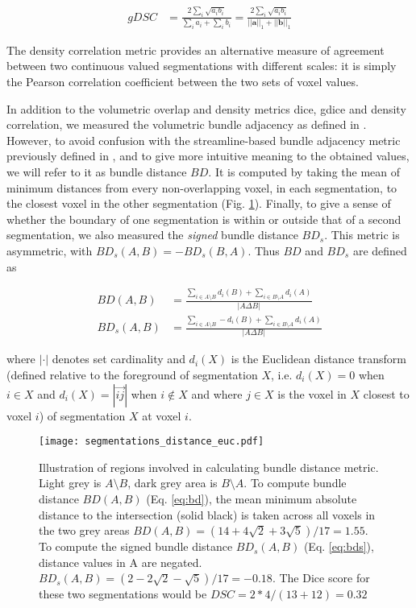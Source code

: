 \begin{align}
  gDSC &= \frac{2 \sum_i \sqrt{a_ib_i} }{\sum_ia_i + \sum_ib_i}
   =  \frac{2 \sum_i \sqrt{a_ib_i} }{||\mathbf{a}||_1 + ||\mathbf{b}||_1}
\end{align}

The density correlation metric provides an alternative measure of agreement between two continuous valued segmentations with different scales:
it is simply the Pearson correlation coefficient between the two sets of voxel values.

In addition to the volumetric overlap and density metrics \gls{dice}, \gls{gdice} and density correlation, we measured the volumetric bundle adjacency as defined in \textcite{Schilling2021a}.
However, to avoid confusion with the streamline-based bundle adjacency\autocite{Radwan2022, Garyfallidis2012, Rheault2022} metric previously defined in \textcite{Garyfallidis2012},
and to give more intuitive meaning to the obtained values, we will refer to it as bundle distance $BD$.
It is computed by taking the mean of minimum distances from every non-overlapping voxel, in each segmentation, to the closest voxel in the other segmentation (Fig. \ref{fig:BD}).
Finally, to give a sense of whether the boundary of one segmentation is within or outside that of a second segmentation, we also measured the \textit{signed} bundle distance $BD_s$.
This metric is asymmetric, with $BD_s (A,B) = -BD_s(B,A)$.
Thus $BD$ and $BD_s$ are defined as

\begin{align}
  BD(A,B) &= \frac{\sum_{i \in A\setminus B} d_i(B) + \sum_{i \in B\setminus A} d_i(A)}{|A\Delta B|} \label{eq:bd} \\
  BD_s(A,B) &= \frac{\sum_{i \in A\setminus B} - d_i(B) + \sum_{i \in B\setminus A} d_i(A)}{|A\Delta B|} \label{eq:bds}
\end{align}

where $| \cdot |$ denotes set cardinality and $d_i(X)$ is the Euclidean distance transform (defined relative to the foreground of segmentation $X$, i.e. $d_i(X) = 0$ when $i \in X $ and $d_i(X) = |\overrightarrow{ij}|$ when $i \not\in X$ and where $j \in X$ is the voxel in $X$ closest to voxel $i$)  of segmentation $X$ at voxel $i$.

\begin{figure}[htbp!]
  \centering
  \texttt{[image: segmentations\_distance\_euc.pdf]}
  \caption{Illustration of regions involved in calculating bundle distance metric. Light grey is $A\setminus B$, dark grey area is $B\setminus A$. To compute bundle distance $BD(A,B)$ (Eq. \ref{eq:bd}), the mean minimum absolute distance to the intersection (solid black) is taken across all voxels in the two grey areas $BD(A,B) = (14+4\sqrt{2}+3\sqrt{5})/17 = 1.55$. To compute the signed bundle distance $BD_s(A,B)$ (Eq. \ref{eq:bds}), distance values in A are negated. $BD_s(A,B) = (2-2\sqrt{2}-\sqrt{5})/17 = -0.18$. The Dice score for these two segmentations would be $DSC = 2*4/(13+12) = 0.32$}
  \label{fig:BD}
\end{figure}

